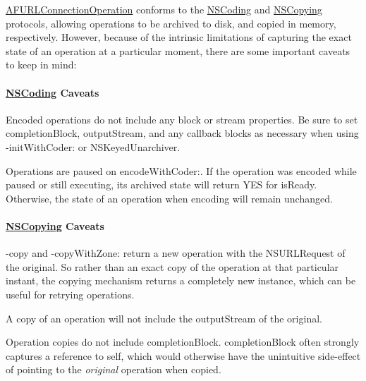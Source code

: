{\ttfamily \hyperlink{interface_a_f_u_r_l_connection_operation}{A\-F\-U\-R\-L\-Connection\-Operation}} conforms to the {\ttfamily \hyperlink{class_n_s_coding-p}{N\-S\-Coding}} and {\ttfamily \hyperlink{class_n_s_copying-p}{N\-S\-Copying}} protocols, allowing operations to be archived to disk, and copied in memory, respectively. However, because of the intrinsic limitations of capturing the exact state of an operation at a particular moment, there are some important caveats to keep in mind\-:

\paragraph*{\hyperlink{class_n_s_coding-p}{N\-S\-Coding} Caveats}


\begin{DoxyItemize}
\item Encoded operations do not include any block or stream properties. Be sure to set {\ttfamily completion\-Block}, {\ttfamily output\-Stream}, and any callback blocks as necessary when using {\ttfamily -\/init\-With\-Coder\-:} or {\ttfamily N\-S\-Keyed\-Unarchiver}.
\item Operations are paused on {\ttfamily encode\-With\-Coder\-:}. If the operation was encoded while paused or still executing, its archived state will return {\ttfamily Y\-E\-S} for {\ttfamily is\-Ready}. Otherwise, the state of an operation when encoding will remain unchanged.
\end{DoxyItemize}

\paragraph*{\hyperlink{class_n_s_copying-p}{N\-S\-Copying} Caveats}


\begin{DoxyItemize}
\item {\ttfamily -\/copy} and {\ttfamily -\/copy\-With\-Zone\-:} return a new operation with the {\ttfamily N\-S\-U\-R\-L\-Request} of the original. So rather than an exact copy of the operation at that particular instant, the copying mechanism returns a completely new instance, which can be useful for retrying operations.
\item A copy of an operation will not include the {\ttfamily output\-Stream} of the original.
\item Operation copies do not include {\ttfamily completion\-Block}. {\ttfamily completion\-Block} often strongly captures a reference to {\ttfamily self}, which would otherwise have the unintuitive side-\/effect of pointing to the {\itshape original} operation when copied. 
\end{DoxyItemize}

